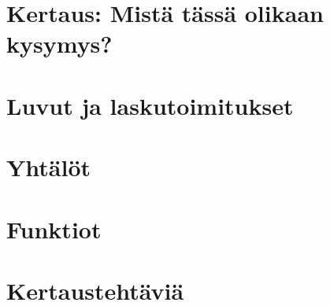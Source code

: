 
\chapter*{Kertaus: Mistä tässä olikaan kysymys?}
    
    

\chapter{Luvut ja laskutoimitukset}
    
    
    
    
    
    
    

\chapter{Yhtälöt}
    
    
    
    
    
    

\chapter{Funktiot}
    
    
    
    
    

\chapter{Kertaustehtäviä}
    
    
    

